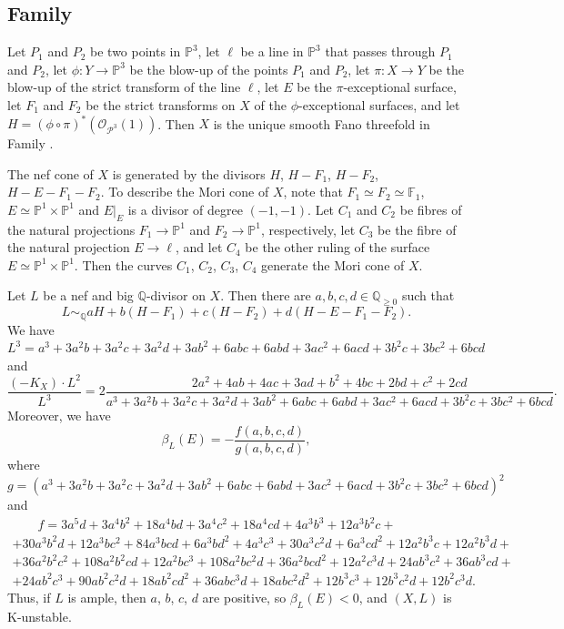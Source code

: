 \documentclass[12pt]{amsart}
\theoremstyle{definition}
\theoremstyle{remark}
\begin{document}
\subsection{Family }
\label{subsection:4-12}

Let $P_1$ and $P_2$ be two points in $\mathbb{P}^3$, let $\ell$ be a line in $\mathbb{P}^3$ that passes through $P_1$ and $P_2$, let $\phi\colon Y\to\mathbb{P}^3$ be the blow-up of the points $P_1$ and $P_2$, let $\pi\colon X\to Y$ be the blow-up of the strict transform of the line $\ell$, let $E$ be the $\pi$-exceptional surface, let $F_1$ and $F_2$ be the strict transforms on $X$ of the $\phi$-exceptional surfaces, and let $H=(\phi\circ\pi)^*(\mathcal{O}_{\mathcal{P}^3}(1))$. Then $X$ is the unique smooth Fano threefold in Family .

The nef cone of $X$ is generated by the divisors $H$, $H-F_1$, $H-F_2$, $H-E-F_1-F_2$.
To describe the Mori cone of $X$, note that $F_1\simeq F_2\simeq\mathbb{F}_1$, $E\simeq\mathbb{P}^1\times\mathbb{P}^1$
and $E\vert_{E}$ is a divisor of degree $(-1,-1)$.
Let $C_1$ and $C_2$ be fibres of the natural projections $F_1\to\mathbb{P}^1$ and $F_2\to\mathbb{P}^1$, respectively,
let $C_3$ be the fibre of the natural projection $E\to\ell$, and let $C_4$ be the other ruling of the surface $E\simeq\mathbb{P}^1\times\mathbb{P}^1$.
Then the curves $C_1$, $C_2$, $C_3$, $C_4$ generate the Mori cone of $X$.

Let $L$ be a nef and big $\mathbb{Q}$-divisor on $X$. Then there are $a,b,c,d\in\mathbb{Q}_{\geqslant 0}$ such that
$$
L\sim_{\mathbb{Q}} aH+b(H-F_1)+c(H-F_2)+d(H-E-F_1-F_2).
$$
We have $L^3=a^3+3a^2b+3a^2c+3a^2d+3ab^2+6abc+6abd+3ac^2+6acd+3b^2c+3bc^2+6bcd$ and
$$
\frac{(-K_X)\cdot L^{2}}{L^3}=2\frac{2a^2+4ab+4ac+3ad+b^2+4bc+2bd+c^2+2cd}{a^3+3a^2b+3a^2c+3a^2d+3ab^2+6abc+6abd+3ac^2+6acd+3b^2c+3bc^2+6bcd}.
$$
Moreover, we have
$$
\beta_{L}(E)=-\frac{f(a,b,c,d)}{g(a,b,c,d)},
$$
where $g=(a^3+3a^2b+3a^2c+3a^2d+3ab^2+6abc+6abd+3ac^2+6acd+3b^2c+3bc^2+6bcd)^2$ and
\begin{multline*}
\quad \quad f=3a^5d+3a^4b^2+18a^4bd+3a^4c^2+18a^4cd+4a^3b^3+12a^3b^2c+\\
+30a^3b^2d+12a^3bc^2+84a^3bcd+6a^3bd^2+4a^3c^3+30a^3c^2d+6a^3cd^2+12a^2b^3c+12a^2b^3d+\\
+36a^2b^2c^2+108a^2b^2cd+12a^2bc^3+108a^2bc^2d+36a^2bcd^2+12a^2c^3d+24ab^3c^2+36ab^3cd+\\
+24ab^2c^3+90ab^2c^2d+18ab^2cd^2+36abc^3d+18abc^2d^2+12b^3c^3+12b^3c^2d+12b^2c^3d.\quad \quad \quad
\end{multline*}
Thus, if $L$ is ample, then $a$, $b$, $c$, $d$ are positive, so $\beta_L(E)<0$, and $(X,L)$ is K-unstable.
\end{document}
